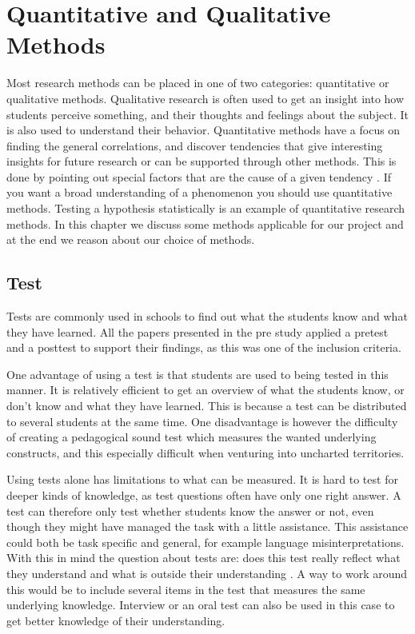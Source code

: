 \section{Quantitative and Qualitative Methods}\label{sec:methodsss}
Most research methods can be placed in one of two categories: quantitative or qualitative methods. Qualitative research is often used to get an insight into how students perceive something, and their thoughts and feelings about the subject. It is also used to understand their behavior. Quantitative methods have a focus on finding the general correlations, and discover tendencies that give interesting insights for future research or can be supported through other methods. This is done by pointing out special factors that are the cause of a given tendency \cite{tjora2012kvalitative}. If you want a broad understanding of a phenomenon you should use quantitative methods. Testing a hypothesis statistically is an example of quantitative research methods. In this chapter we discuss some methods applicable for our project and at the end we reason about our choice of methods. 

\subsection*{Test}
Tests are commonly used  in schools to find out what the students know and what they have learned. All the papers presented in the pre study applied a pretest and a posttest to support their findings, as this was one of the inclusion criteria. 

\bigskip\noindent
One advantage of using a test is that students are used to being tested in this manner. It is relatively efficient to get an overview of what the students know, or don't know and what they have learned. This is because a test can be distributed to several students at the same time. 
One disadvantage is however the difficulty of creating a pedagogical sound test which measures the wanted underlying constructs, and this especially difficult when venturing into uncharted territories. 

\bigskip\noindent
Using tests alone has limitations to what can be measured. It is hard to test for deeper kinds of knowledge, as test questions often have only one right answer. A test can therefore only test whether students know the answer or not, even though they might have managed the task with a little assistance. This assistance could both be task specific and general, for example language misinterpretations. With this in mind the question about tests are: does this test really reflect what they understand and what is outside their understanding \cite{andersen2009evaluering}. A way to work around this would be to include several items in the test that measures the same underlying knowledge. Interview or an oral test can also be used in this case to get better knowledge of their understanding.

